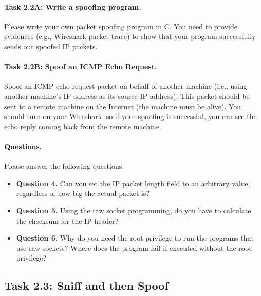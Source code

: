 \paragraph{Task 2.2A: Write a spoofing program.}
Please write your own packet spoofing program in C. You need 
to provide evidences (e.g., Wireshark packet trace) to show that your 
program successfully sends out spoofed IP packets.


\paragraph{Task 2.2B: Spoof an ICMP Echo Request.}
Spoof an ICMP echo request packet on behalf of another machine (i.e., 
using another machine's IP address as its source IP address). This packet 
should be sent to a remote machine on the Internet (the machine must be
alive). You should turn on your Wireshark, so if your spoofing is successful, 
you can see the echo reply coming back from the remote machine. 



\paragraph{Questions.} Please answer the following questions.

\begin{itemize}
\item \textbf{Question 4.}
Can you set the IP packet length field to an arbitrary value,
regardless of how big the actual packet is? 


\item \textbf{Question 5.} 
Using the raw socket programming, do you have to calculate the 
checksum for the IP header? 

\item \textbf{Question 6.} 
Why do you need the root privilege to run the programs that 
use raw sockets? Where does the program fail if executed without the root 
privilege?

\end{itemize}
 





\subsection{Task 2.3: Sniff and then Spoof}

